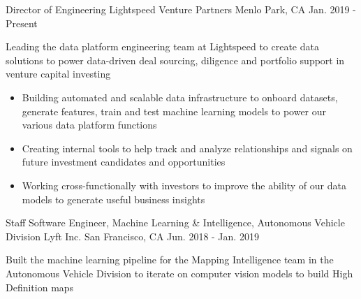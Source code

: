 

\begin{cventries}

  \cventry
    {Director of Engineering} %
    {Lightspeed Venture Partners} %
    {Menlo Park, CA} %
    {Jan. 2019 - Present} %
    {
      \begin{cvitems} %
        \item{Leading the data platform engineering team at Lightspeed to create data solutions to power data-driven deal sourcing, diligence and portfolio support in venture capital investing}
        \begin{itemize}[label=$\circ$]
          \item{Building automated and scalable data infrastructure to onboard datasets, generate features, train and test machine learning models to power our various data platform functions}
          \item{Creating internal tools to help track and analyze relationships and signals on future investment candidates and opportunities}
          \item{Working cross-functionally with investors to improve the ability of our data models to generate useful business insights}
        \end{itemize}
      \end{cvitems}
    }

  \cventry
    {Staff Software Engineer, Machine Learning \& Intelligence, Autonomous Vehicle Division} %
    {Lyft Inc.} %
    {San Francisco, CA} %
    {Jun. 2018 - Jan. 2019} %
    {
      \begin{cvitems} %
        \item{Built the machine learning pipeline for the Mapping Intelligence team in the Autonomous Vehicle Division to iterate on computer vision models to build High Definition maps}
      \end{cvitems}
    }


\end{cventries}
